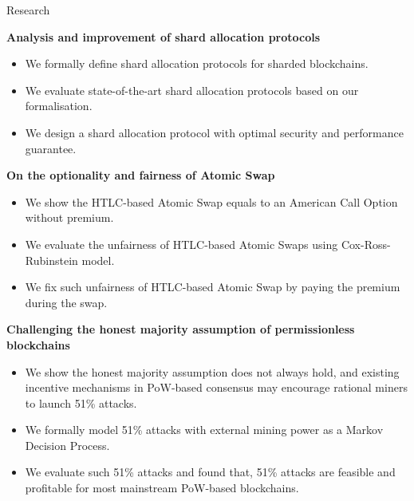 \documentclass{resume} %
\begin{document}
\begin{rSection}{Research}

\textbf{Analysis and improvement of shard allocation protocols}
\begin{itemize}
    \item We formally define shard allocation protocols for sharded blockchains.
    \item We evaluate state-of-the-art shard allocation protocols based on our formalisation.
    \item We design a shard allocation protocol with optimal security and performance guarantee.
\end{itemize}

\textbf{On the optionality and fairness of Atomic Swap}
\begin{itemize}
    \item We show the HTLC-based Atomic Swap equals to an American Call Option without premium.
    \item We evaluate the unfairness of HTLC-based Atomic Swaps using Cox-Ross-Rubinstein model.
    \item We fix such unfairness of HTLC-based Atomic Swap by paying the premium during the swap.
\end{itemize}

\textbf{Challenging the honest majority assumption of permissionless blockchains}
\begin{itemize}
    \item We show the honest majority assumption does not always hold, and existing incentive mechanisms in PoW-based consensus may encourage rational miners to launch 51\% attacks.
    \item We formally model 51\% attacks with external mining power as a Markov Decision Process.
    \item We evaluate such 51\% attacks and found that, 51\% attacks are feasible and profitable for most mainstream PoW-based blockchains.
\end{itemize}


\end{rSection}
\end{document}
